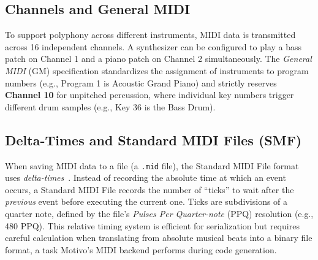 \subsection{Channels and General MIDI}\label{detail-subsec:channels-and-general-midi}

To support polyphony across different instruments, MIDI data is transmitted across 16 independent channels.
A synthesizer can be configured to play a bass patch on Channel 1 and a piano patch on Channel 2 simultaneously.
The \textit{General MIDI} (GM) specification standardizes the assignment of instruments to program numbers (e.g.,
Program 1 is Acoustic Grand Piano) and strictly reserves \textbf{Channel 10} for unpitched percussion, where individual
key numbers trigger different drum samples (e.g., Key 36 is the Bass Drum).

\subsection{Delta-Times and Standard MIDI Files (SMF)}\label{detail-subsec:delta-times-and-standard-midi-files-(smf)}

When saving MIDI data to a file (a \texttt{.mid} file), the Standard MIDI File format uses
\textit{delta-times}~\cite{MMA_SMF_1996}.
Instead of recording the absolute time at which an event occurs, a Standard MIDI File records the number of ``ticks'' to
wait after the \textit{previous} event before executing the current one.
Ticks are subdivisions of a quarter note, defined by the file's \textit{Pulses Per Quarter-note} (PPQ) resolution (e.g.,
480 PPQ).
This relative timing system is efficient for serialization but requires careful calculation when translating from
absolute musical beats into a binary file format, a task Motivo's MIDI backend performs during code generation.
